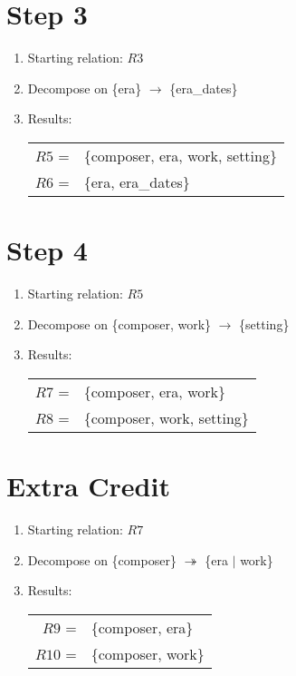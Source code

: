 \documentclass[11pt,letterpaper]{article}
\begin{document}
\section*{Step 3}
\begin{enumerate}
    \item Starting relation: $R3$
    \item Decompose on \{era\} $\to$ \{era\_dates\}
    \item Results:

    \begin{tabular*}{4in}{r l}
        $R5$ =& \{composer, era, work, setting\} \\
        $R6$ =& \{era, era\_dates\} \\
    \end{tabular*}
\end{enumerate}
\clearpage
\section*{Step 4}
\begin{enumerate}
    \item Starting relation: $R5$
    \item Decompose on \{composer, work\} $\to$ \{setting\}
    \item Results:

    \begin{tabular*}{4in}{r l}
        $R7$ =& \{composer, era, work\} \\
        $R8$ =& \{composer, work, setting\} \\
    \end{tabular*}
\end{enumerate}


\section*{Extra Credit}
\begin{enumerate}
    \item Starting relation: $R7$
    \item Decompose on \{composer\} $\twoheadrightarrow$ \{era $|$ work\}
    \item Results:
    
    \begin{tabular*}{4in}{r l}
        $R9$ =& \{composer, era\} \\
        $R10$ =& \{composer, work\} \\
    \end{tabular*}
\end{enumerate}
\end{document}
